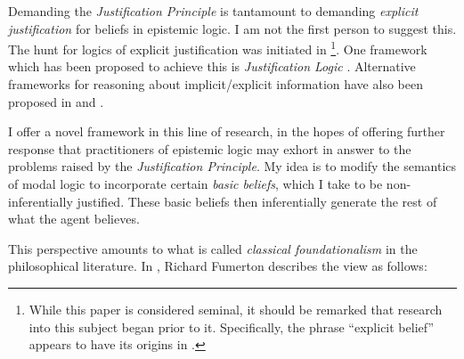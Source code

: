 \documentclass[11pt]{article}
\numberwithin{equation}{subsection}
\begin{document}

Demanding the \emph{Justification Principle} is tantamount to demanding
\emph{explicit justification} for beliefs in epistemic logic. I am not
the first person to suggest this. The hunt for logics of
explicit justification was initiated in
\citet{van_benthem_reflectionsepistemic_1991}\footnote{While this
  paper is considered seminal, it should be remarked that research
  into this subject began prior to it.  Specifically, the
  phrase ``explicit belief'' appears to have its origins in
  \citep{levesque_logic_1984}.}. One framework which has been proposed
to achieve this is \emph{Justification Logic}
\citep{artemov_introducing_2005,artemov_justification_2007,fitting_logic_2004,fitting_logic_2005}.
Alternative frameworks for reasoning about implicit/explicit
information have also been proposed in \citet{van_benthem_inference_2009} and
\citet{velzquez-quesada_inference_2009}.

I offer a novel framework in this line of research, in the hopes of
offering further response that practitioners of epistemic logic may
exhort in answer to the problems raised by the 
\emph{Justification Principle}.  
My idea is to modify the semantics of modal logic to incorporate 
certain \emph{basic beliefs}, which I take to be non-inferentially 
justified.  These basic beliefs then inferentially generate the rest 
of what the agent believes.

This perspective amounts to what is called 
\emph{classical foundationalism} in the philosophical literature.  
In \citep[chapter 1]{depaul_resurrecting_2001}, Richard
Fumerton describes the view as follows:
\end{document}
